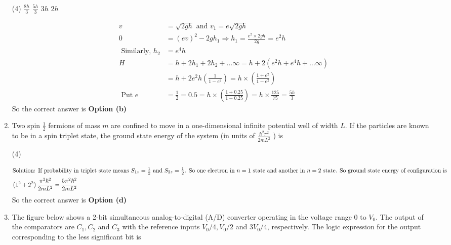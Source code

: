 \begin{enumerate}
 \begin{tasks}(4)
	\task[\textbf{a.}]$\frac{8 h}{3}$
	\task[\textbf{b.}]$\frac{5 h}{3}$
	\task[\textbf{c.}] $3 h$
	\task[\textbf{d.}] $2 h$
\end{tasks}
\begin{answer}
	\begin{align*}
	v&=\sqrt{2 g h} \text { and } v_{1}=e \sqrt{2 g h}\\
	0&=(e v)^{2}-2 g h_{1} \Rightarrow h_{1}=\frac{e^{2} \times 2 g h}{2 g}=e^{2} h\\
	\text { Similarly, } h_{2}&=e^{4} h\\
	H&=h+2 h_{1}+2 h_{2}+\ldots \infty=h+2\left(e^{2} h+e^{4} h+\ldots \infty\right) \\
	&=h+2 e^{2} h\left(\frac{1}{1-e^{2}}\right)=h \times\left(\frac{1+e^{2}}{1-e^{2}}\right)\\
	\text { Put } e&=\frac{1}{2}=0.5=h \times\left(\frac{1+0.25}{1-0.25}\right)=h \times \frac{125}{75}=\frac{5 h}{3}
	\end{align*}
		So the correct answer is \textbf{Option (b)}
\end{answer}
\item Two spin $\frac{1}{2}$ fermions of mass $m$ are confined to move in a one-dimensional infinite potential well of width $L$. If the particles are known to be in a spin triplet state, the ground state energy of the system (in units of $\frac{\hbar^{2} \pi^{2}}{2 m L^{2}}$ ) is
 \begin{tasks}(4)
\end{tasks}
\begin{answer}
	\begin{align*}
	\intertext{Solution: If probability in triplet state means $S_{1 z}=\frac{1}{2}$ and $S_{2 z}=\frac{1}{2}$. So one electron in $n=1$ state and another in $n=2$ state. So ground state energy of configuration is}
	\left(1^{2}+2^{2}\right) \frac{\pi^{2} \hbar^{2}}{2 m L^{2}}&=\frac{5 \pi^{2} \hbar^{2}}{2 m L^{2}}
	\end{align*}
		So the correct answer is \textbf{Option (d)}
\end{answer}
\item  The figure below shows a 2-bit simultaneous analog-to-digital (A/D) converter operating in the voltage range 0 to $V_{0}$. The output of the comparators are $C_{1}, C_{2}$ and $C_{3}$ with the reference inputs $V_{0} / 4, V_{0} / 2$ and $3 V_{0} / 4$, respectively. The logic expression for the output corresponding to the less significant bit is	

\end{enumerate}
